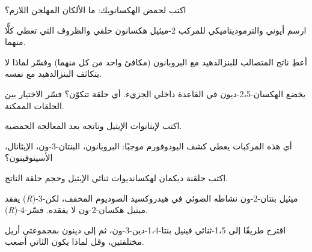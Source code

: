 \begin{exercise}[$\star$]\label{exo:b2:enolates-aldol:4}
اكتب  لحمض الهكسانويك: ما الألكان المهلجن اللازم؟
\end{exercise}

\begin{exercise}[$\star\star$]\label{exo:b2:enolates-aldol:5}
ارسم أيوني  والترموديناميكي للمركب 2-ميثيل هكسانون حلقي والظروف التي تعطي
كلًّا منهما.
\end{exercise}

\begin{exercise}[$\star\star$]\label{exo:b2:enolates-aldol:6}
أعطِ ناتج  المتصالب للبنزالدهيد مع البروبانون (مكافئ واحد من كل
منهما) وفسّر لماذا لا يتكاثف البنزالدهيد مع نفسه.
\end{exercise}

\begin{exercise}[$\star\star$]\label{exo:b2:enolates-aldol:7}
يخضع الهكسان-2،5-ديون في القاعدة  داخلي الجزيء. أي حلقة تتكوّن؟ فسّر
الاختيار بين الحلقات الممكنة.
\end{exercise}

\begin{exercise}[$\star\star$]\label{exo:b2:enolates-aldol:8}
اكتب  لإيثانوات الإيثيل وناتجه بعد المعالجة الحمضية.
\end{exercise}

\begin{exercise}[$\star\star$]\label{exo:b2:enolates-aldol:9}
أي هذه المركبات يعطي كشف اليودوفورم موجبًا: البروبانون، البنتان-3-ون، الإيثانال، الأسيتوفينون؟
\end{exercise}

\begin{exercise}[$\star\star\star$]\label{exo:b2:enolates-aldol:10}
اكتب حلقنة ديكمان لهكسانديوات ثنائي الإيثيل وحجم حلقة الناتج.
\end{exercise}

\begin{exercise}[$\star\star\star$]\label{exo:b2:enolates-aldol:11}
يفقد (\textit{R})-3-ميثيل بنتان-2-ون نشاطه الضوئي في هيدروكسيد الصوديوم المخفف، لكن
(\textit{R})-4-ميثيل هكسان-2-ون لا يفقده. فسّر.
\end{exercise}

\begin{exercise}[$\star\star\star$]\label{exo:b2:enolates-aldol:12}
اقترح طريقًا إلى 1،5-ثنائي فينيل بنتا-1،4-دين-3-ون، ثم إلى دينون بمجموعتي أريل مختلفتين،
وقل لماذا يكون الثاني أصعب.
\end{exercise}

